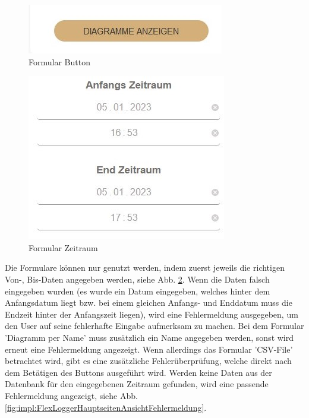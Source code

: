 \begin{figure}
    \centering
    \includegraphics[scale=1]{pics/FlexLoggerWebsiteFormulare_button.jpg}
    \caption{Formular Button}
    \label{fig:impl:FlexLoggerHauptseitenAnsichtButton}
\end{figure}
 
\begin{figure}
    \centering
    \includegraphics[scale=1]{pics/FlexLoggerWebsiteFormulare_zeitraum.jpg}
    \caption{Formular Zeitraum}
    \label{fig:impl:FlexLoggerHauptseitenAnsichtZeitraum}
\end{figure}

Die Formulare können nur genutzt werden, indem zuerst jeweils die richtigen Von-, Bis-Daten angegeben werden, siehe Abb. \ref{fig:impl:FlexLoggerHauptseitenAnsichtZeitraum}. Wenn die Daten falsch eingegeben wurden (es wurde ein Datum eingegeben, welches hinter dem Anfangsdatum liegt bzw. bei einem gleichen Anfangs- und Enddatum muss die Endzeit hinter der Anfangszeit liegen), wird eine Fehlermeldung ausgegeben, um den User auf seine fehlerhafte Eingabe aufmerksam zu machen. Bei dem Formular 'Diagramm per Name' muss zusätzlich ein Name angegeben werden, sonst wird erneut eine Fehlermeldung angezeigt. Wenn allerdings das Formular 'CSV-File' betrachtet wird, gibt es eine zusätzliche Fehlerüberprüfung, welche direkt nach dem Betätigen des Buttons ausgeführt wird. Werden keine Daten aus der Datenbank für den eingegebenen Zeitraum gefunden, wird eine passende Fehlermeldung angezeigt, siehe Abb. \ref{fig:impl:FlexLoggerHauptseitenAnsichtFehlermeldung}.
 
